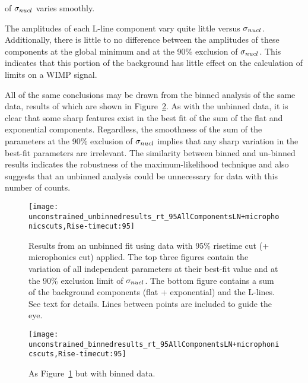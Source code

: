 of $\sigma_{nucl}$ varies smoothly.  

The amplitudes of each L-line component vary quite little versus $\sigma_{nucl}$.  Additionally, there is little to no difference between the amplitudes of these components at the global minimum and at the 90\% exclusion of $\sigma_{nucl}$.  This indicates that this portion of the background has little effect on the calculation of limits on a WIMP signal.

All of the same conclusions may be drawn from the binned analysis of the same data, results of which are shown in Figure~\ref{fig:BinnedResultsNoConstrain}.  As with the unbinned data, it is clear that some sharp features exist in the best fit of the sum of the flat and exponential components.  Regardless, the smoothness of the sum of the parameters at the 90\% exclusion of $\sigma_{nucl}$ implies that any sharp variation in the best-fit parameters are irrelevant.  The similarity between binned and un-binned results indicates the robustness of the maximum-likelihood technique and also suggests that an unbinned analysis could be unnecessary for data with this number of counts.
  
			\begin{figure}
				\centering				
				\texttt{[image: unconstrained\_unbinnedresults\_rt\_95AllComponentsLN+microphonicscuts,Rise-timecut:95]}				
				
				\caption[Results from an unbinned fit using data with 95\% risetime cut (+ microphonics cut) applied]
				{Results from an unbinned fit using data with 95\% risetime cut (+ microphonics cut) applied.
				The top three figures contain the variation of all independent parameters at their best-fit value and at the 90\% exclusion
				limit of $\sigma_{nucl}$.  The bottom figure contains a sum of the background components (flat + exponential) and
				the L-lines.  See text for details.  Lines between points are included to guide the eye.}
				\label{fig:UnbinnedResultsNoConstrain}
			\end{figure}
			\begin{figure}
				\centering				
				\texttt{[image: unconstrained\_binnedresults\_rt\_95AllComponentsLN+microphonicscuts,Rise-timecut:95]}				
				
				\caption[Results from an binned fit using data with 95\% risetime cut (+ microphonics cut) applied]
				{As Figure~\ref{fig:UnbinnedResultsNoConstrain} but with binned data.}
				\label{fig:BinnedResultsNoConstrain}
			\end{figure}
			
